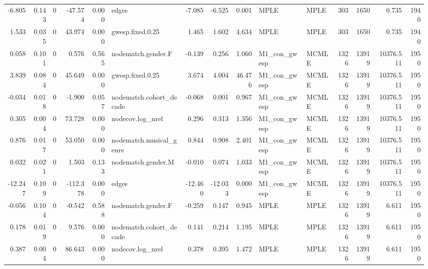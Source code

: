 \begin{table}
\begin{tabular}{rrrrrlrrrllrrrr}
   -6.805 & 0.143 &        0 &  -47.574 &     0.000 &                   edges &  -7.085 &  -6.525 &  0.001 &         MPLE &   MPLE &     303 &     1650 &     0.735 &      1940 \\
    1.533 & 0.035 &        0 &   43.974 &     0.000 &        gwesp.fixed.0.25 &   1.465 &   1.602 &  4.634 &         MPLE &   MPLE &     303 &     1650 &     0.735 &      1940 \\
    0.058 & 0.101 &        0 &    0.576 &     0.565 &      nodematch.gender.F &  -0.139 &   0.256 &  1.060 & M1\_con\_gwesp &  MCMLE &    1326 &    13919 & 10376.511 &      1950 \\
    3.839 & 0.084 &        0 &   45.649 &     0.000 &        gwesp.fixed.0.25 &   3.674 &   4.004 & 46.476 & M1\_con\_gwesp &  MCMLE &    1326 &    13919 & 10376.511 &      1950 \\
   -0.034 & 0.018 &        0 &   -1.900 &     0.057 & nodematch.cohort\_decade &  -0.068 &   0.001 &  0.967 & M1\_con\_gwesp &  MCMLE &    1326 &    13919 & 10376.511 &      1950 \\
    0.305 & 0.004 &        0 &   73.728 &     0.000 &        nodecov.log\_nrel &   0.296 &   0.313 &  1.356 & M1\_con\_gwesp &  MCMLE &    1326 &    13919 & 10376.511 &      1950 \\
    0.876 & 0.017 &        0 &   53.050 &     0.000 & nodematch.musical\_genre &   0.844 &   0.908 &  2.401 & M1\_con\_gwesp &  MCMLE &    1326 &    13919 & 10376.511 &      1950 \\
    0.032 & 0.021 &        0 &    1.503 &     0.133 &      nodematch.gender.M &  -0.010 &   0.074 &  1.033 & M1\_con\_gwesp &  MCMLE &    1326 &    13919 & 10376.511 &      1950 \\
  -12.247 & 0.109 &        0 & -112.378 &     0.000 &                   edges & -12.460 & -12.033 &  0.000 & M1\_con\_gwesp &  MCMLE &    1326 &    13919 & 10376.511 &      1950 \\
   -0.056 & 0.104 &        0 &   -0.542 &     0.588 &      nodematch.gender.F &  -0.259 &   0.147 &  0.945 &         MPLE &   MPLE &    1326 &    13919 &     6.611 &      1950 \\
    0.178 & 0.019 &        0 &    9.576 &     0.000 & nodematch.cohort\_decade &   0.141 &   0.214 &  1.195 &         MPLE &   MPLE &    1326 &    13919 &     6.611 &      1950 \\
    0.387 & 0.004 &        0 &   86.643 &     0.000 &        nodecov.log\_nrel &   0.378 &   0.395 &  1.472 &         MPLE &   MPLE &    1326 &    13919 &     6.611 &      1950 \\

\end{tabular}
\end{table}

